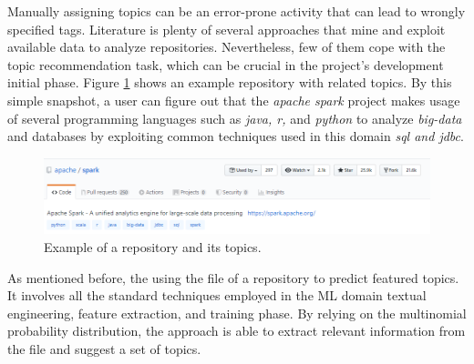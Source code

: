 
Manually assigning topics can be an error-prone activity that can lead to
wrongly specified tags. Literature is plenty of several approaches that mine and exploit available data to analyze repositories. Nevertheless, few of them cope with the topic recommendation task, which can be crucial in the project's development initial phase. Figure \ref{fig:spark} shows an example repository with related topics. By this simple snapshot, a \GH user can figure out that the \emph{apache spark} project makes usage of several programming languages such as \emph{java, r,} and \emph{python} to analyze \emph{big-data} and databases by exploiting common techniques used in this domain \ie \emph{sql and jdbc}. 

\begin{figure}[h!]
	\centering
	\includegraphics[width=0.8\linewidth]{figs/spark_topics.png}
	\caption{Example of a \GH repository and its topics.}%
	\label{fig:spark}
\end{figure}

As mentioned before, the \MNB using the \RM file of a repository to predict featured topics. It involves all the standard techniques employed in the ML domain \ie textual engineering, feature extraction, and training phase. By relying on the multinomial probability distribution, the approach is able to extract relevant information from the \RM file and suggest a set of topics. 